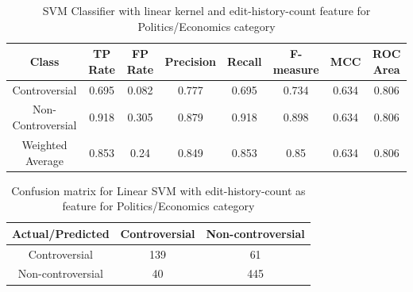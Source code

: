 \documentclass[twocolumn]{article}
\begin{document}
 
 
 \begin{table}[Politics/Economics]
 	\centering
 	\begin{tabular}{|c|c|c|c|c|c|c|c|}
 		\hline
 		\textbf{Class} & \textbf{TP Rate} & \textbf{FP Rate} & \textbf{Precision} & \textbf{Recall} & \textbf{F-measure} & \textbf{MCC} & \textbf{ROC Area} \\
 		\hline
 		\hline
 		Controversial & 0.695 & 0.082 & 0.777 & 0.695 & 0.734 & 0.634 & 0.806 \\
 		Non-Controversial & 0.918 & 0.305 & 0.879 & 0.918 & 0.898 & 0.634 & 0.806\\
 		Weighted Average & 0.853 & 0.24 & 0.849 & 0.853 & 0.85 & 0.634 & 0.806 \\
 		\hline
 	\end{tabular}
 	\centering
 	\caption{SVM Classifier with linear kernel and edit-history-count feature for Politics/Economics category}
 	\label{tab:results}
 \end{table}
 
 \begin{table}[Politics/Economics]
 	\centering
 	\begin{tabular}{|c|c|c|}
 		\hline
 		\textbf{Actual/Predicted} & Controversial &Non-controversial \\
 		\hline
 		Controversial & 139 & 61\\
 		Non-controversial & 40 & 445\\
 		\hline
 	\end{tabular}
 	\caption{Confusion matrix for Linear SVM with edit-history-count as feature for Politics/Economics category}
 	\label{tab:results}
 \end{table}
 
\end{document}
